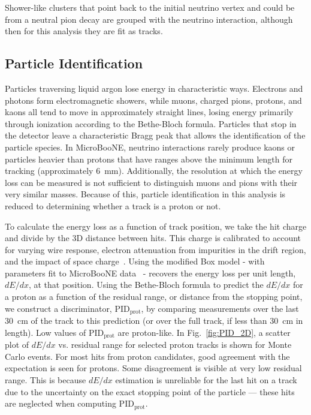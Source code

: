 \documentclass[%
twocolumn,
 amsmath,amssymb,
 aps,
prd,
superscriptaddress,showpacs]{revtex4-2}
\begin{document}
Shower-like clusters that point back to the initial neutrino vertex and could be from a neutral pion decay are grouped with the neutrino interaction, although then for this analysis they are fit as tracks.

\subsection{Particle Identification}

Particles traversing liquid argon lose energy in characteristic ways.
Electrons and photons form electromagnetic showers, while muons, charged pions, protons, and kaons all tend to move in approximately straight lines, losing energy primarily through ionization according to the Bethe-Bloch formula.
Particles that stop in the detector leave a characteristic Bragg peak that allows the identification of the particle species.
In MicroBooNE, neutrino interactions rarely produce kaons or particles heavier than protons that have ranges above the minimum length for tracking (approximately 6~mm).
Additionally, the resolution at which the energy loss can be measured is not sufficient to distinguish muons and pions with their very similar masses.
Because of this, particle identification in this analysis is reduced to determining whether a track is a proton or not.

To calculate the energy loss as a function of track position, we take the hit charge and divide by the 3D distance between hits.
This charge is calibrated to account for varying wire response, electron attenuation from impurities in the drift region, and the impact of space charge~\cite{Adams:2019ssgCAL}.
Using the modified Box model - with parameters fit to MicroBooNE data~\cite{Adams:2019ssgCAL} - recovers the energy loss per unit length, $dE/dx$, at that position.
Using the Bethe-Bloch formula to predict the $dE/dx$ for a proton as a function of the residual range, or distance from the stopping point, we construct a discriminator, $\text{PID}_\text{prot}$, by comparing measurements over the last 30~cm of the track to this prediction (or over the full track, if less than 30~cm in length).
Low values of $\text{PID}_\text{prot}$ are proton-like.
In Fig.~\ref{fig:PID_2D}, a scatter plot of $dE/dx$ vs. residual range for selected proton tracks is shown for Monte Carlo events.
For most hits from proton candidates, good agreement with the expectation is seen for protons.
Some disagreement is visible at very low residual range.
This is because $dE/dx$ estimation is unreliable for the last hit on a track due to the uncertainty on the exact stopping point of the particle --- these hits are neglected when computing $\text{PID}_\text{prot}$.
\end{document}
